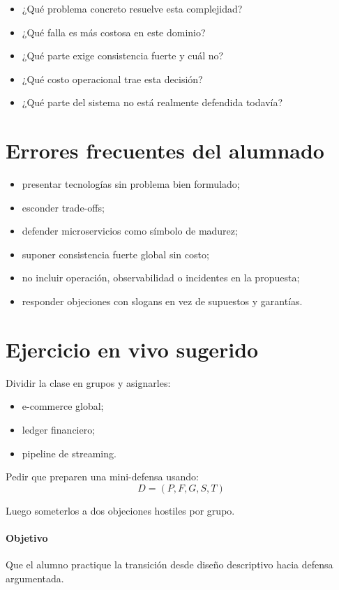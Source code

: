 \documentclass[variant=docente,cover=institutional,mode=screen]{ua-engineering-v6-article}
\begin{document}
\begin{itemize}
\item ¿Qué problema concreto resuelve esta complejidad?
\item ¿Qué falla es más costosa en este dominio?
\item ¿Qué parte exige consistencia fuerte y cuál no?
\item ¿Qué costo operacional trae esta decisión?
\item ¿Qué parte del sistema no está realmente defendida todavía?
\end{itemize}

\section{Errores frecuentes del alumnado}

\begin{itemize}
\item presentar tecnologías sin problema bien formulado;
\item esconder trade-offs;
\item defender microservicios como símbolo de madurez;
\item suponer consistencia fuerte global sin costo;
\item no incluir operación, observabilidad o incidentes en la propuesta;
\item responder objeciones con slogans en vez de supuestos y garantías.
\end{itemize}

\section{Ejercicio en vivo sugerido}

Dividir la clase en grupos y asignarles:
\begin{itemize}
\item e-commerce global;
\item ledger financiero;
\item pipeline de streaming.
\end{itemize}

Pedir que preparen una mini-defensa usando:
\[
D = (P,F,G,S,T)
\]

Luego someterlos a dos objeciones hostiles por grupo.

\paragraph{Objetivo}
Que el alumno practique la transición desde diseño descriptivo hacia defensa argumentada.
\end{document}
